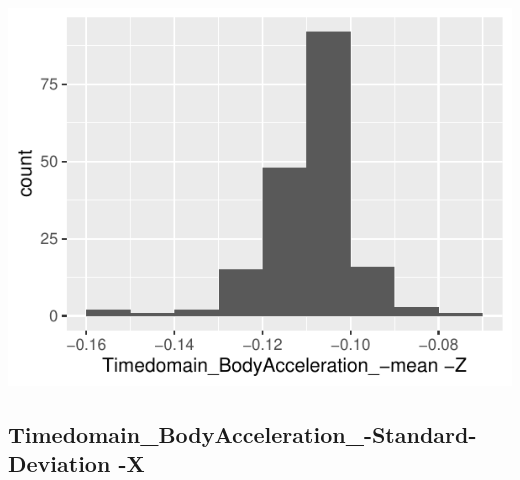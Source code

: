 \documentclass[
]{article}
\begin{document}
\begin{minipage}{0.25 \textwidth}

\includegraphics{codebook_tidydatasub_files/figure-latex/Var-5-Timedomain-BodyAcceleration--mean--Z-1.pdf}

\end{minipage}

\noindent\makebox[\linewidth]{\rule{\textwidth}{0.4pt}}

\hypertarget{timedomain_bodyacceleration_-standard-deviation--x}{%
\subsection{Timedomain\_BodyAcceleration\_-Standard-Deviation
-X}\label{timedomain_bodyacceleration_-standard-deviation--x}}
\end{document}
